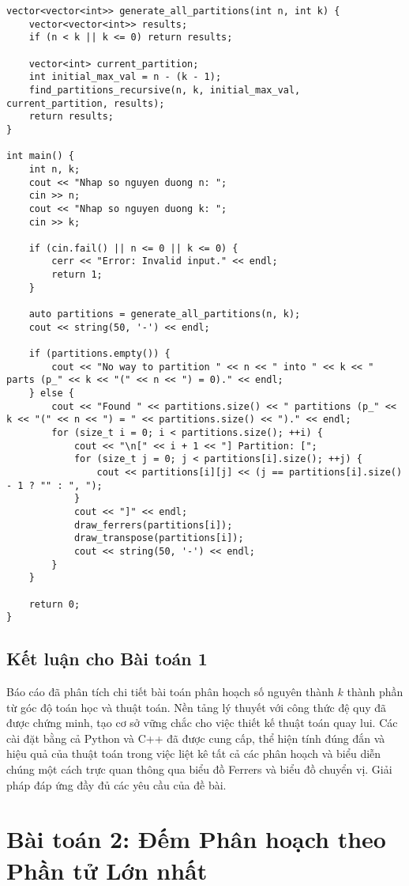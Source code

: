 \documentclass[a4paper,12pt]{article}
\begin{document}
\begin{lstlisting}[style=cppstyle, caption={Partition enumeration and Ferrers diagrams in C++.}, label={lst:cpp_partition_eng}]
vector<vector<int>> generate_all_partitions(int n, int k) {
    vector<vector<int>> results;
    if (n < k || k <= 0) return results;
    
    vector<int> current_partition;
    int initial_max_val = n - (k - 1);
    find_partitions_recursive(n, k, initial_max_val, current_partition, results);
    return results;
}

int main() {
    int n, k;
    cout << "Nhap so nguyen duong n: ";
    cin >> n;
    cout << "Nhap so nguyen duong k: ";
    cin >> k;

    if (cin.fail() || n <= 0 || k <= 0) {
        cerr << "Error: Invalid input." << endl;
        return 1;
    }

    auto partitions = generate_all_partitions(n, k);
    cout << string(50, '-') << endl;
    
    if (partitions.empty()) {
        cout << "No way to partition " << n << " into " << k << " parts (p_" << k << "(" << n << ") = 0)." << endl;
    } else {
        cout << "Found " << partitions.size() << " partitions (p_" << k << "(" << n << ") = " << partitions.size() << ")." << endl;
        for (size_t i = 0; i < partitions.size(); ++i) {
            cout << "\n[" << i + 1 << "] Partition: [";
            for (size_t j = 0; j < partitions[i].size(); ++j) {
                cout << partitions[i][j] << (j == partitions[i].size() - 1 ? "" : ", ");
            }
            cout << "]" << endl;
            draw_ferrers(partitions[i]);
            draw_transpose(partitions[i]);
            cout << string(50, '-') << endl;
        }
    }

    return 0;
}
\end{lstlisting}

\subsection{Kết luận cho Bài toán 1}
Báo cáo đã phân tích chi tiết bài toán phân hoạch số nguyên thành $k$ thành phần từ góc độ toán học và thuật toán. Nền tảng lý thuyết với công thức đệ quy đã được chứng minh, tạo cơ sở vững chắc cho việc thiết kế thuật toán quay lui. Các cài đặt bằng cả Python và C++ đã được cung cấp, thể hiện tính đúng đắn và hiệu quả của thuật toán trong việc liệt kê tất cả các phân hoạch và biểu diễn chúng một cách trực quan thông qua biểu đồ Ferrers và biểu đồ chuyển vị. Giải pháp đáp ứng đầy đủ các yêu cầu của đề bài.


\section{Bài toán 2: Đếm Phân hoạch theo Phần tử Lớn nhất}
\end{document}
